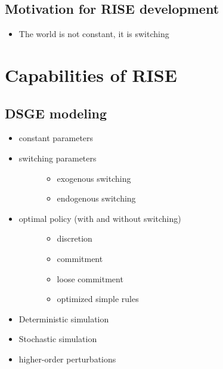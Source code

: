 \documentclass[letterpaper,10pt,english]{sphinxmanual}
\begin{document}
\subsection{Motivation for RISE development}
\label{intro_folder/rise_at_a_glance:motivation-for-rise-development}\begin{itemize}
\item {} 
The world is not constant, it is switching

\end{itemize}


\section{Capabilities of RISE}
\label{intro_folder/rise_capabilities::doc}\label{intro_folder/rise_capabilities:capabilities-of-rise}

\subsection{DSGE modeling}
\label{intro_folder/rise_capabilities:dsge-modeling}\begin{itemize}
\item {} 
constant parameters

\item {} \begin{description}
\item[{switching parameters}] \leavevmode\begin{itemize}
\item {} 
exogenous switching

\item {} 
endogenous switching

\end{itemize}

\end{description}

\item {} \begin{description}
\item[{optimal policy (with and without switching)}] \leavevmode\begin{itemize}
\item {} 
discretion

\item {} 
commitment

\item {} 
loose commitment

\item {} 
optimized simple rules

\end{itemize}

\end{description}

\item {} 
Deterministic simulation

\item {} 
Stochastic simulation

\item {} 
higher-order perturbations

\end{itemize}
\end{document}
